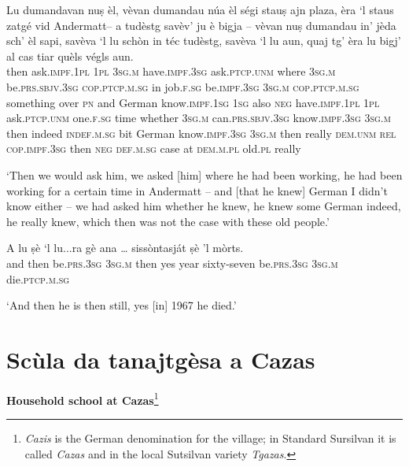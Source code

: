 \begin{linenumbers}
\gll Lu dumandavan nuṣ èl, vèvan dumandau núa èl ségi stauṣ ajn plaza, èra `l staus zatgé vid Andermatt– a tudèstg savèv’ ju è bigja – vèvan nuṣ dumandau in' jèda sch’ èl sapi, savèva `l lu schòn in téc tudèstg, savèva `l lu aun, quaj tg’ èra lu bigj' al cas tiar quèls végls aun.   \\
then ask.\textsc{impf.1pl} \textsc{1pl} \textsc{3sg.m} have.\textsc{impf.3sg}  ask.\textsc{ptcp.unm} where \textsc{3sg.m} be.\textsc{prs.sbjv.3sg} \textsc{cop.ptcp.m.sg} in job.\textsc{f.sg} be.\textsc{impf.3sg} \textsc{3sg.m}  \textsc{cop.ptcp.m.sg} something over \textsc{pn} and German know.\textsc{impf.1sg} \textsc{1sg} also \textsc{neg} {} have.\textsc{impf.1pl} \textsc{1pl} ask.\textsc{ptcp.unm} one.\textsc{f.sg} time whether \textsc{3sg.m} can.\textsc{prs.sbjv.3sg} know.\textsc{impf.3sg} \textsc{3sg.m} then indeed \textsc{indef.m.sg} bit German know.\textsc{impf.3sg} \textsc{3sg.m} then really \textsc{dem.unm} \textsc{rel} \textsc{cop.impf.3sg} then \textsc{neg} \textsc{def.m.sg} case at \textsc{dem.m.pl} old.\textsc{pl} really \\
\end{linenumbers}
\medskip
\glt `Then we would ask him, we asked [him] where he had been working, he had been working for a certain time in Andermatt – and [that he knew] German I didn't know either – we had asked him whether he knew, he knew some German indeed, he really knew, which then was not the case with these old people.'
\medskip

\begin{linenumbers}
\gll  A lu ṣè `l lu...ra gè ana … sissòntasját ṣè 'l mòrts. \\
and then be.\textsc{prs.3sg} \textsc{3sg.m} then yes year {} sixty-seven be.\textsc{prs.3sg} \textsc{3sg.m} die.\textsc{ptcp.m.sg} \\
\end{linenumbers}
\medskip
\glt `And then he is then still, yes [in] 1967 he died.'
\medskip

\section{Scùla da tanajtgèsa a Cazas}

\noindent
\textbf{Household school at Cazas}\footnote{\textit{Cazis} is the German denomination for the village; in Standard Sursilvan it is called \textit{Cazas} and in the local Sutsilvan variety \textit{Tgazas}.}

